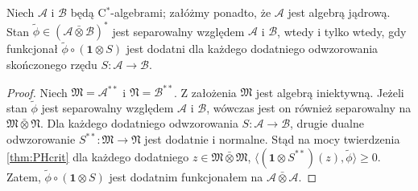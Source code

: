 \begin{Theorem}
Niech $\mathcal{A}$ i $\mathcal{B}$ będą C$^{*}$-algebrami; załóżmy ponadto, że
$\mathcal{A}$ jest algebrą jądrową.
Stan $\tilde{\phi} \in
(\mathcal{A} \bar{\otimes} \mathcal{B})^{*}$ jest separowalny
względem $\mathcal{A}$ i $\mathcal{B}$,
wtedy i tylko wtedy, gdy
funkcjonał $\tilde{\phi} \circ ( \mathbf{1} \otimes S )$
jest dodatni dla każdego dodatniego odwzorowania skończonego rzędu
$S: \mathcal{A} \rightarrow \mathcal{B}$.
\end{Theorem}
\begin{proof}
Niech $\mathfrak{M}=\mathcal{A}^{**}$ i $\mathfrak{N}=\mathcal{B}^{**}$.
Z założenia $\mathfrak{M}$ jest algebrą iniektywną.
Jeżeli stan $\tilde{\phi}$ jest separowalny względem
$\mathcal{A}$ i $\mathcal{B}$, wówczas jest on również separowalny na
$\mathfrak{M} \bar{\otimes} \mathfrak{N}$.
Dla każdego dodatniego odwzorowania
$S: \mathcal{A} \rightarrow \mathcal{B}$, drugie dualne odwzorowanie
$S^{**}:\mathfrak{M} \rightarrow \mathfrak{N}$ jest dodatnie i normalne.
Stąd na mocy twierdzenia \ref{thm:PHcrit} dla każdego dodatniego
$z \in \mathfrak{M} \bar{\otimes} \mathfrak{M}$,
$\langle (\mathbf{1} \otimes S^{**})(z), \tilde{\phi} \rangle \geq 0$.
Zatem, $\tilde{\phi} \circ (\mathbf{1} \otimes S)$ jest dodatnim funkcjonałem
na $\mathcal{A} \bar{\otimes} \mathcal{A}$.


\end{proof}

